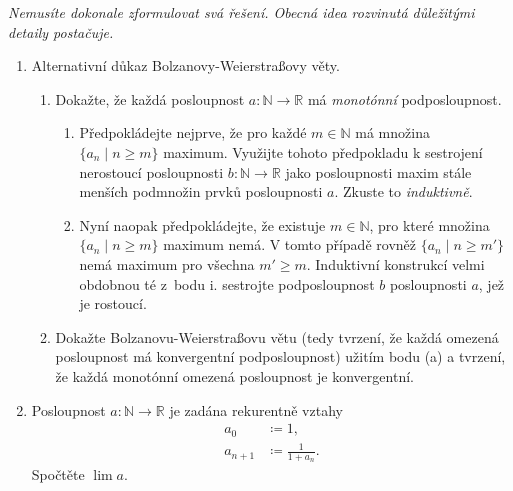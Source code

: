 \documentclass[a4paper,11pt]{article}
\newcommand{\R}{\mathbb{R}}
\newcommand{\N}{\mathbb{N}}
\begin{document}
 \begin{tcolorbox}[breakable,title=\textsf{Těžké úlohy a důkazy (12
  bodů)},arc=0mm,boxsep=3mm,bottomrule=1pt,toprule=1pt,leftrule=-0.1mm,
  rightrule=-0.1mm,colframe=BrickRed!80!white,colback=BrickRed!5!white]
  \emph{Nemusíte dokonale zformulovat svá řešení. Obecná idea rozvinutá
  důležitými detaily postačuje.}
  \begin{enumerate}
   \item Alternativní důkaz Bolzanovy-Weierstraßovy věty.
   \begin{enumerate}
    \item Dokažte, že každá posloupnost $a:\N \to \R$ má \emph{monotónní}
     podposloupnost.
    \begin{enumerate}
     \item Předpokládejte nejprve, že pro každé $m \in \N$ má množina $\{a_n
      \mid n \geq m\}$ maximum. Využijte tohoto předpokladu k sestrojení
      nerostoucí posloupnosti $b:\N \to \R$ jako posloupnosti maxim stále
      menších podmnožin prvků posloupnosti $a$. Zkuste to \emph{induktivně}.
     \item Nyní naopak předpokládejte, že existuje $m \in \N$, pro které množina
      $\{a_n \mid n \geq m\}$ maximum nemá. V tomto případě rovněž $\{a_n \mid
      n \geq m'\}$ nemá maximum pro všechna $m' \geq m$. Induktivní konstrukcí
      velmi obdobnou té z~bodu i. sestrojte podposloupnost $b$ posloupnosti $a$,
      jež je rostoucí.
    \end{enumerate}
   \item Dokažte Bolzanovu-Weierstraßovu větu (tedy tvrzení, že každá omezená
    posloupnost má konvergentní podposloupnost) užitím bodu (a) a tvrzení, že
    každá monotónní omezená posloupnost je konvergentní.
   \end{enumerate}
  \item Posloupnost $a:\N \to \R$ je zadána rekurentně vztahy
   \begin{align*}
    a_0 & \coloneqq 1,\\
    a_{n+1} & \coloneqq \frac{1}{1+a_n}.
   \end{align*}
   Spočtěte $\lim a$.
  \end{enumerate}
 \end{tcolorbox}
\end{document}
